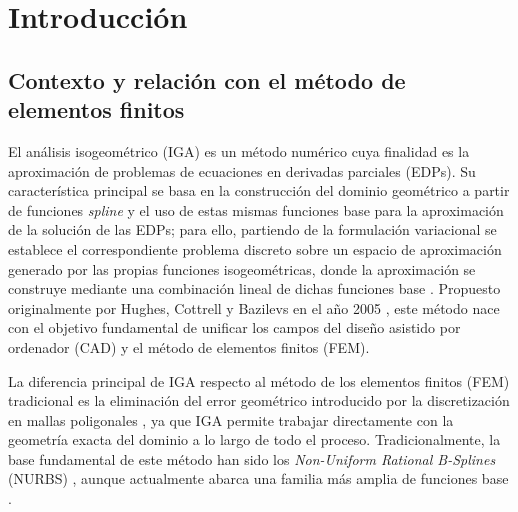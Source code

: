 \documentclass[11pt]{book}
\newcommand{\clearemptydoublepage}{\newpage{\pagestyle{empty}\cleardoublepage}}
\theoremstyle{plain} %
\theoremstyle{definition} %
\theoremstyle{definition} %
\begin{document}
\tableofcontents

\clearemptydoublepage

\mainmatter                      %
\pagestyle{miestilo}    %

\chapter{Introducción}

\vspace{-0.75cm}

\section{Contexto y relación con el método de elementos finitos}

\vspace{-0.1cm}

El análisis isogeométrico (IGA) es un método numérico cuya finalidad es la aproximación de problemas de ecuaciones en derivadas parciales (EDPs). Su característica principal se basa en la construcción del dominio geométrico a partir de funciones \textit{spline} y el uso de estas mismas funciones base para la aproximación de la solución de las EDPs; para ello, partiendo de la formulación variacional se establece el correspondiente problema discreto sobre un espacio de aproximación generado por las propias funciones isogeométricas, donde la aproximación se construye mediante una combinación lineal de dichas funciones base \cite{hughes_isogeometric_2005, cottrell_isogeometric_2009}. Propuesto originalmente por Hughes, Cottrell y Bazilevs en el año 2005 \cite{hughes_isogeometric_2005}, este método nace con el objetivo fundamental de unificar los campos del diseño asistido por ordenador (CAD) y el método de elementos finitos (FEM). 

\vspace{-0.05cm}

La diferencia principal de IGA respecto al método de los elementos finitos (FEM) tradicional es la eliminación del error geométrico introducido por la discretización en mallas poligonales \cite{hughes_isogeometric_2005}, ya que IGA permite trabajar directamente con la geometría exacta del dominio a lo largo de todo el proceso. Tradicionalmente, la base fundamental de este método han sido los \textit{Non-Uniform Rational B-Splines} (NURBS) \cite{piegl_nurbs_2012}, aunque actualmente abarca una familia más amplia de funciones base \cite{bazilevs_isogeometric_2010}.
\end{document}
